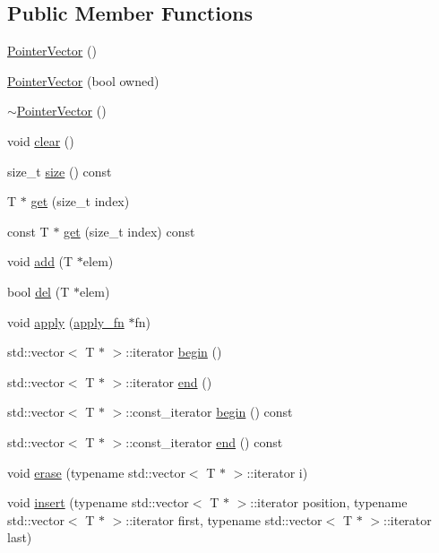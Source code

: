 \subsection*{Public Member Functions}
\begin{DoxyCompactItemize}
\item 
\hyperlink{classPointerVector_a44ef76bb36f22d17606d8af8ef12d499}{Pointer\+Vector} ()
\item 
\hyperlink{classPointerVector_ac1c5b843d7862e9db7189d459324e246}{Pointer\+Vector} (bool owned)
\item 
\hyperlink{classPointerVector_a5fd5c0d94cdb693be9a8bb5c2b3e305c}{$\sim$\+Pointer\+Vector} ()
\item 
void \hyperlink{classPointerVector_a9f708acfaa3ce26d14b02d8e285c8729}{clear} ()
\item 
size\+\_\+t \hyperlink{classPointerVector_a65263559ccd6a9eac2904c691453867b}{size} () const 
\item 
T $\ast$ \hyperlink{classPointerVector_af28c2517157ddacfb4d92a4fc73c5a92}{get} (size\+\_\+t index)
\item 
const T $\ast$ \hyperlink{classPointerVector_a298c14996c9995cc56efc2deadd01fe5}{get} (size\+\_\+t index) const 
\item 
void \hyperlink{classPointerVector_abaee9f77dee6ea2523dff64b184c9f54}{add} (T $\ast$elem)
\item 
bool \hyperlink{classPointerVector_acb88f3cb0aa36baaebabc0900bb304e6}{del} (T $\ast$elem)
\item 
void \hyperlink{classPointerVector_a5e9ccf28859f06f13ad3e2dad9ae1cb6}{apply} (\hyperlink{classPointerVector_a578da527d71168684229a721b16e823f}{apply\+\_\+fn} $\ast$fn)
\item 
std\+::vector$<$ T $\ast$ $>$\+::iterator \hyperlink{classPointerVector_a594866129f2e9a3701c1f414ca3299e3}{begin} ()
\item 
std\+::vector$<$ T $\ast$ $>$\+::iterator \hyperlink{classPointerVector_a6182f5429c4c98ba2556d40484aab2f9}{end} ()
\item 
std\+::vector$<$ T $\ast$ $>$\+::const\+\_\+iterator \hyperlink{classPointerVector_a97ee9f133fa9e61341f33feb3f36f45b}{begin} () const 
\item 
std\+::vector$<$ T $\ast$ $>$\+::const\+\_\+iterator \hyperlink{classPointerVector_a62f1573b2bdffb20efaad8fbff6d7676}{end} () const 
\item 
void \hyperlink{classPointerVector_a1107df98d34db68e3153e67196a16a11}{erase} (typename std\+::vector$<$ T $\ast$ $>$\+::iterator i)
\item 
void \hyperlink{classPointerVector_a0a7659a1819768998582533c65825501}{insert} (typename std\+::vector$<$ T $\ast$ $>$\+::iterator position, typename std\+::vector$<$ T $\ast$ $>$\+::iterator first, typename std\+::vector$<$ T $\ast$ $>$\+::iterator last)
\end{DoxyCompactItemize}


